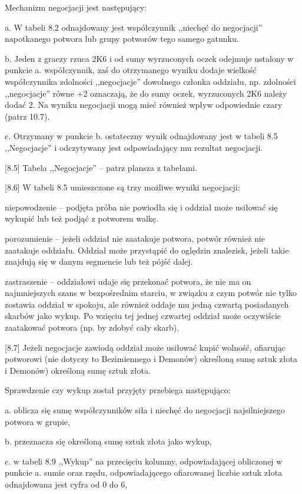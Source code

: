 Mechanizm negocjacji jest następujący:

a.
W tabeli 8.2 odnajdowany jest współczynnik ,,niechęć do negocjacji'' napotkanego potwora lub grupy potworów tego samego gatunku.

b.
Jeden z graczy rzuca 2K6 i od sumy wyrzuconych oczek odejmuje ustalony w punkcie a. współczynnik, zaś do otrzymanego wyniku dodaje wielkość współczynnika zdolności ,,negocjacje'' dowolnego członka oddziału, np. zdolności ,,negocjacje'' równe +2 oznaczają, że do sumy oczek, wyrzuconych 2K6 należy dodać 2.
Na wyniku negocjacji mogą mieć również wpływ odpowiednie czary (patrz 10.7).

c.
Otrzymany w punkcie b. ostateczny wynik odnajdowany jest w tabeli 8.5 ,,Negocjacje'' i odczytywany jest odpowiadający mu rezultat negocjacji.

[8.5] Tabela ,,Negocjacje'' – patrz plansza z tabelami.

[8.6] W tabeli 8.5 umieszczone są trzy możliwe wyniki negocjacji:

niepowodzenie – podjęta próba nie powiodła się i oddział może usiłować się wykupić lub też podjąć z potworem walkę.

porozumienie – jeżeli oddział nie zaatakuje potwora, potwór również nie zaatakuje oddziału.
Oddział może przystąpić do oględzin znalezisk, jeżeli takie znajdują się w danym segmencie lub też pójść dalej.

zastraszenie – oddziałowi udaje się przekonać potwora, że nie ma on najmniejszych szans w bezpośrednim starciu, w związku z czym potwór nie tylko zostawia oddział w spokoju, ale również oddaje mu jedną czwartą posiadanych skarbów jako wykup.
Po wzięciu tej jednej czwartej oddział może oczywiście zaatakować potwora (np. by zdobyć cały skarb).

[8.7] Jeżeli negocjacje zawiodą oddział może usiłować kupić wolność, ofiarując potworowi (nie dotyczy to Bezimiennego i Demonów) określoną sumę sztuk złota i Demonów) określoną sumę sztuk złota.

Sprawdzenie czy wykup został przyjęty przebiega następująco:

a. oblicza się sumę współczynników siła i niechęć do negocjacji najsilniejszego potwora w grupie,

b. przeznacza się określoną sumę sztuk złota jako wykup,

c. w tabeli 8.9 ,,Wykup'' na przecięciu kolumny, odpowiadającej obliczonej w punkcie a. sumie oraz rzędu, odpowiadającego ofiarowanej liczbie sztuk złota odnajdowana jest cyfra od 0 do 6,

